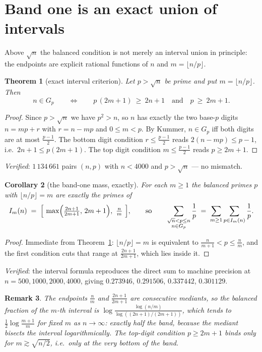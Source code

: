 \documentclass[11pt]{article}
\newtheorem{theorem}{Theorem}
\newtheorem{corollary}[theorem]{Corollary}
\newtheorem{remark}[theorem]{Remark}
\begin{document}
\section{Band one is an exact union of intervals}

Above $\sqrt n$ the balanced condition is not merely an interval union in principle: the
endpoints are explicit rational functions of $n$ and $m=\lfloor n/p\rfloor$.

\begin{theorem}[exact interval criterion]\label{thm:interval}
Let $p>\sqrt n$ be prime and put $m=\lfloor n/p\rfloor$.  Then
\[
  n\in G_p
  \qquad\Longleftrightarrow\qquad
  p\,(2m+1)\ \ge\ 2n+1 \quad\text{and}\quad p\ \ge\ 2m+1 .
\]
\end{theorem}

\begin{proof}
Since $p>\sqrt n$ we have $p^{2}>n$, so $n$ has exactly the two base-$p$ digits
$n=mp+r$ with $r=n-mp$ and $0\le m<p$.  By Kummer, $n\in G_p$ iff both digits are at most
$\tfrac{p-1}{2}$.  The bottom digit condition $r\le\frac{p-1}{2}$ reads $2(n-mp)\le p-1$,
i.e.\ $2n+1\le p(2m+1)$.  The top digit condition $m\le\frac{p-1}{2}$ reads $p\ge2m+1$.
\end{proof}

\emph{Verified}: $1\,134\,661$ pairs $(n,p)$ with $n<4000$ and $p>\sqrt n$ --- no mismatch.

\begin{corollary}[the band-one mass, exactly]\label{cor:band1exact}
For each $m\ge1$ the balanced primes $p$ with $\lfloor n/p\rfloor=m$ are exactly the primes
of
\[
  I_m(n)\;=\;\Bigl[\ \max\Bigl(\tfrac{2n+1}{2m+1},\,2m+1\Bigr),\ \tfrac nm\ \Bigr],
  \qquad\text{so}\qquad
  \sum_{\substack{\sqrt n<p\le n\\ n\in G_p}}\frac1p\;=\;\sum_{m\ge1}\sum_{p\in I_m(n)}\frac1p .
\]
\end{corollary}

\begin{proof}
Immediate from Theorem~\ref{thm:interval}: $\lfloor n/p\rfloor=m$ is equivalent to
$\frac{n}{m+1}<p\le\frac nm$, and the first condition cuts that range at
$\frac{2n+1}{2m+1}$, which lies inside it.
\end{proof}

\emph{Verified}: the interval formula reproduces the direct sum to machine precision at
$n=500,1000,2000,4000$, giving $0.273946$, $0.291506$, $0.337442$, $0.301129$.

\begin{remark}
The endpoints $\frac nm$ and $\frac{2n+1}{2m+1}$ are consecutive mediants, so the balanced
fraction of the $m$-th interval is
$\log\frac{\log(n/m)}{\log((2n+1)/(2m+1))}$, which tends to $\tfrac12\log\frac{m+1}{m}$ for
fixed $m$ as $n\to\infty$: exactly half the band, because the mediant bisects the interval
logarithmically.  The top-digit condition $p\ge2m+1$ binds only for $m\gtrsim\sqrt{n/2}$,
i.e.\ only at the very bottom of the band.
\end{remark}
\end{document}
